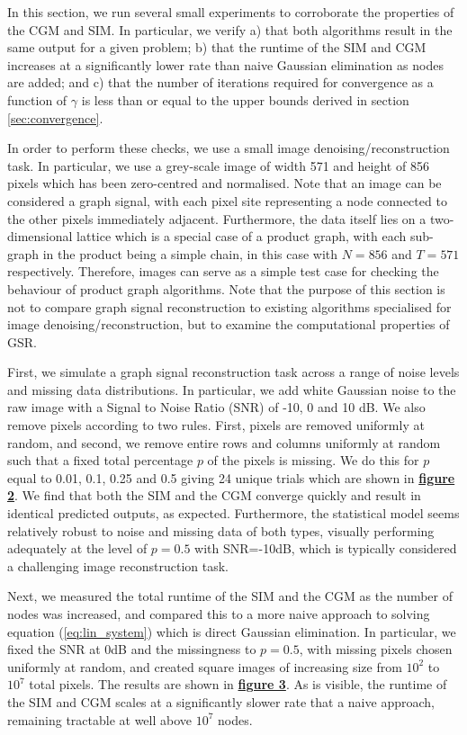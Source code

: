 In this section, we run several small experiments to corroborate the properties of the CGM and SIM. In particular, we verify a) that both algorithms result in the same output for a given problem; b) that the runtime of the SIM and CGM increases at a significantly lower rate than naive Gaussian elimination as nodes are added; and c) that the number of iterations required for convergence as a function of $\gamma$ is less than or equal to the upper bounds derived in section \ref{sec:convergence}.

In order to perform these checks, we use a small image denoising/reconstruction task. In particular, we use a grey-scale image of width 571 and height of 856 pixels which has been zero-centred and normalised. Note that an image can be considered a graph signal, with each pixel site representing a node connected to the other pixels immediately adjacent. Furthermore, the data itself lies on a two-dimensional lattice which is a special case of a product graph, with each sub-graph in the product being a simple chain, in this case with $N=856$ and $T=571$ respectively. Therefore, images can serve as a simple test case for checking the behaviour of product graph algorithms. Note that the purpose of this section is not to compare graph signal reconstruction to existing algorithms specialised for image denoising/reconstruction, but to examine the computational properties of GSR.

First, we simulate a graph signal reconstruction task across a range of noise levels and missing data distributions. In particular, we add white Gaussian noise to the raw image with a Signal to Noise Ratio (SNR) of -10, 0 and 10 dB. We also remove pixels according to two rules. First, pixels are removed uniformly at random, and second, we remove entire rows and columns uniformly at random such that a fixed total percentage $p$ of the pixels is missing. We do this for $p$ equal to 0.01, 0.1, 0.25 and 0.5 giving 24 unique trials which are shown in \hyperlink{butterflies}{\textbf{figure 2}}. We find that both the SIM and the CGM converge quickly and result in identical predicted outputs, as expected. Furthermore, the statistical model seems relatively robust to noise and missing data of both types, visually performing adequately at the level of $p=0.5$ with SNR=-10dB, which is typically considered a challenging image reconstruction task.

Next, we measured the total runtime of the SIM and the CGM as the number of nodes was increased, and compared this to a more naive approach to solving equation (\ref{eq:lin_system}) which is direct Gaussian elimination. In particular, we fixed the SNR at 0dB and the missingness to $p=0.5$, with missing pixels chosen uniformly at random, and created square images of increasing size from $10^2$ to $10^7$ total pixels. The results are shown in \hyperlink{runtime}{\textbf{figure 3}}. As is visible, the runtime of the SIM and CGM scales at a significantly slower rate that a naive approach, remaining tractable at well above $10^7$ nodes.

